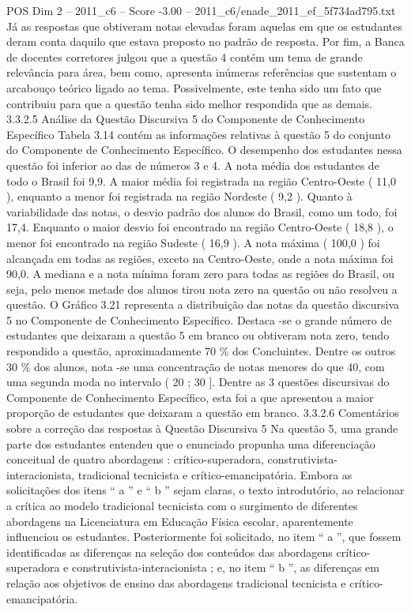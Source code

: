 \begin{textsample}{POS Dim 2 – 2011\_c6 – Score -3.00 – 2011\_c6/enade\_2011\_ef\_5f734ad795.txt}
Já as respostas que obtiveram notas elevadas foram aquelas em que os estudantes deram conta daquilo que estava proposto no padrão de resposta.
Por fim, a Banca de docentes corretores julgou que a questão 4 contém um tema de grande relevância para área, bem como, apresenta inúmeras referências que sustentam o arcabouço teórico ligado ao tema.
Possivelmente, este tenha sido um fato que contribuiu para que a questão tenha sido melhor respondida que as demais. 3.3.2.5 Análise da Questão Discursiva 5 do Componente de Conhecimento Específico Tabela 3.14 contém as informações relativas à questão 5 do conjunto do Componente de Conhecimento Específico.
O desempenho dos estudantes nessa questão foi inferior ao das de números 3 e 4.
A nota média dos estudantes de todo o Brasil foi 9,9.
A maior média foi registrada na região Centro-Oeste ( 11,0 ), enquanto a menor foi registrada na região Nordeste ( 9,2 ).
Quanto à variabilidade das notas, o desvio padrão dos alunos do Brasil, como um todo, foi 17,4.
Enquanto o maior desvio foi encontrado na região Centro-Oeste ( 18,8 ), o menor foi encontrado na região Sudeste ( 16,9 ).
A nota máxima ( 100,0 ) foi alcançada em todas as regiões, exceto na Centro-Oeste, onde a nota máxima foi 90,0.
A mediana e a nota mínima foram zero para todas as regiões do Brasil, ou seja, pelo menos metade dos alunos tirou nota zero na questão ou não resolveu a questão.
O Gráfico 3.21 representa a distribuição das notas da questão discursiva 5 no Componente de Conhecimento Específico.
Destaca -se o grande número de estudantes que deixaram a questão 5 em branco ou obtiveram nota zero, tendo respondido a questão, aproximadamente 70 \% dos Concluintes.
Dentre os outros 30 \% dos alunos, nota -se uma concentração de notas menores do que 40, com uma segunda moda no intervalo ( 20 ; 30 ].
Dentre as 3 questões discursivas do Componente de Conhecimento Específico, esta foi a que apresentou a maior proporção de estudantes que deixaram a questão em branco. 3.3.2.6 Comentários sobre a correção das respostas à Questão Discursiva 5 Na questão 5, uma grande parte dos estudantes entendeu que o enunciado propunha uma diferenciação conceitual de quatro abordagens : crítico-superadora, construtivista-interacionista, tradicional tecnicista e crítico-emancipatória.
Embora as solicitações dos itens “ a ” e “ b ” sejam claras, o texto introdutório, ao relacionar a crítica ao modelo tradicional tecnicista com o surgimento de diferentes abordagens na Licenciatura em Educação Física escolar, aparentemente influenciou os estudantes.
Posteriormente foi solicitado, no item “ a ”, que fossem identificadas as diferenças na seleção dos conteúdos das abordagens crítico-superadora e construtivista-interacionista ; e, no item “ b ”, as diferenças em relação aos objetivos de ensino das abordagens tradicional tecnicista e crítico-emancipatória.

\end{textsample}
